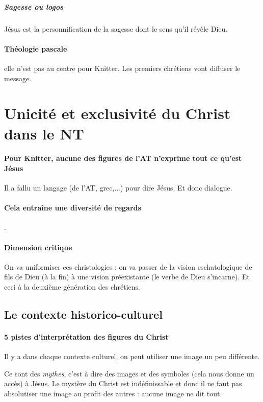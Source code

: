 \subparagraph{Sagesse ou logos} Jésus est la personnification de la sagesse dont le sens qu'il révèle Dieu.

\paragraph{Théologie pascale} elle n'est pas au centre pour Knitter. Les premiers chrétiens vont diffuser le message. 

\section{Unicité et exclusivité du Christ dans le NT}


\paragraph{Pour Knitter, aucune des figures de l'AT n'exprime tout ce qu'est Jésus}
Il a fallu un langage (de l'AT, grec,...) pour dire Jésus. Et donc dialogue.

\paragraph{Cela entraîne une diversité de regards}.

\paragraph{Dimension critique} On va uniformiser ces christologies : on va passer de la vision eschatologique de fils de Dieu (à la fin) à une vision préexistante (le verbe de Dieu s'incarne). Et ceci à la deuxième génération des chrétiens. 



\subsection{Le contexte historico-culturel} 


\paragraph{5 pistes d'interprétation des figures du Christ} Il y a dans chaque contexte culturel, on peut utiliser une image un peu différente.

Ce sont des \textit{mythes}, c'est à dire des images et des symboles (cela nous donne un accès) à Jésus. Le mystère du Christ est indéfinissable et donc il ne faut pas absolutiser une image au profit des autres : aucune image ne dit tout. 

